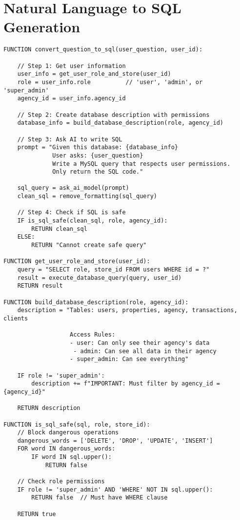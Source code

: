\section*{Natural Language to SQL Generation}

\begin{verbatim}
FUNCTION convert_question_to_sql(user_question, user_id):
    
    // Step 1: Get user information
    user_info = get_user_role_and_store(user_id)
    role = user_info.role          // 'user', 'admin', or 'super_admin'
    agency_id = user_info.agency_id
    
    // Step 2: Create database description with permissions
    database_info = build_database_description(role, agency_id)
    
    // Step 3: Ask AI to write SQL
    prompt = "Given this database: {database_info}
              User asks: {user_question}
              Write a MySQL query that respects user permissions.
              Only return the SQL code."
    
    sql_query = ask_ai_model(prompt)
    clean_sql = remove_formatting(sql_query)
    
    // Step 4: Check if SQL is safe
    IF is_sql_safe(clean_sql, role, agency_id):
        RETURN clean_sql
    ELSE:
        RETURN "Cannot create safe query"

FUNCTION get_user_role_and_store(user_id):
    query = "SELECT role, store_id FROM users WHERE id = ?"
    result = execute_database_query(query, user_id)
    RETURN result

FUNCTION build_database_description(role, agency_id):
    description = "Tables: users, properties, agency, transactions, clients
                   
                   Access Rules:
                   - user: Can only see their agency's data
                    - admin: Can see all data in their agency  
                   - super_admin: Can see everything"
    
    IF role != 'super_admin':
        description += f"IMPORTANT: Must filter by agency_id = {agency_id}"
    
    RETURN description

FUNCTION is_sql_safe(sql, role, store_id):
    // Block dangerous operations
    dangerous_words = ['DELETE', 'DROP', 'UPDATE', 'INSERT']
    FOR word IN dangerous_words:
        IF word IN sql.upper():
            RETURN false
    
    // Check role permissions
    IF role != 'super_admin' AND 'WHERE' NOT IN sql.upper():
        RETURN false  // Must have WHERE clause
    
    RETURN true
\end{verbatim}

